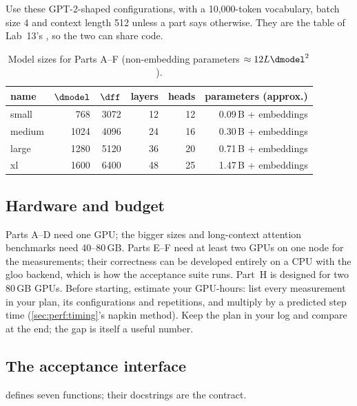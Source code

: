 Use these GPT-2-shaped configurations, with a 10{,}000-token vocabulary, batch size 4 and context
length 512 unless a part says otherwise. They are the  table of Lab~13's
, so the two can share code.

\begin{table}[h]
\centering\small
\begin{tabular}{lrrrrr}
\toprule
name & $\dmodel$ & $\dff$ & layers & heads & parameters (approx.)\\
\midrule
small  & 768  & 3072 & 12 & 12 & 0.09\,B + embeddings\\
medium & 1024 & 4096 & 24 & 16 & 0.30\,B + embeddings\\
large  & 1280 & 5120 & 36 & 20 & 0.71\,B + embeddings\\
xl     & 1600 & 6400 & 48 & 25 & 1.47\,B + embeddings\\
\bottomrule
\end{tabular}
\caption{Model sizes for Parts A--F (non-embedding parameters $\approx12L\dmodel^2$).}
\label{tab:proj2:sizes}
\end{table}

\subsection{Hardware and budget}

Parts A--D need one GPU; the bigger sizes and long-context attention benchmarks need 40--80\,GB.
Parts E--F need at least two GPUs on one node for the measurements; their correctness can be
developed entirely on a CPU with the gloo backend, which is how the acceptance suite runs. Part~H is
designed for two 80\,GB GPUs. Before starting, estimate your GPU-hours: list every measurement in
your plan, its configurations and repetitions, and multiply by a predicted step time
(\cref{sec:perf:timing}'s napkin method). Keep the plan in your log and compare at the end; the gap is
itself a useful number.

\subsection{The acceptance interface}

 defines seven functions; their docstrings are the contract.

